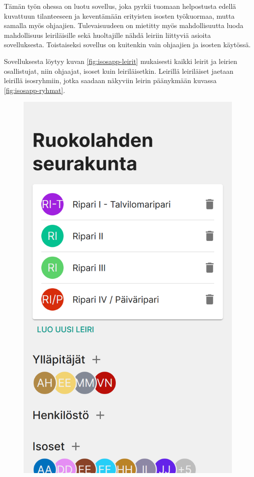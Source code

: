 Tämän työn ohessa on luotu sovellus, joka pyrkii tuomaan helpostusta edellä
kuvattuun tilanteeseen ja keventämään erityisten isosten työkuormaa, mutta
samalla myös ohjaajien. Tulevaisuudeen on mietitty myös mahdollisuutta luoda
mahdollisuus leiriläisille sekä huoltajille nähdä leiriin liittyviä asioita
sovelluksesta. Toistaiseksi sovellus on kuitenkin vain ohjaajien ja isosten
käytössä.

Sovelluksesta löytyy kuvan \ref{fig:isosapp-leirit} mukaisesti kaikki leirit ja
leirien osallistujat, niin ohjaajat, isoset kuin leiriläisetkin. Leirillä
leiriläiset jaetaan leirillä isosryhmiin, jotka saadaan näkyviin leirin
päänykmään kuvassa \ref{fig:isosapp-ryhmat}.

\begin{figure}[h!]
    \centering
    \begin{minipage}[b]{.3\textwidth}
        \includegraphics[width=\textwidth]{figures/isosapp-leirit.png}

\end{minipage}
\end{figure}
